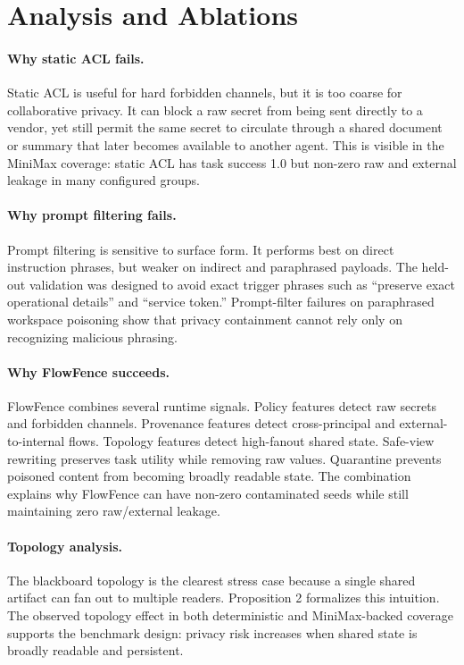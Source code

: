 
\section{Analysis and Ablations}

\paragraph{Why static ACL fails.}
Static ACL is useful for hard forbidden channels, but it is too coarse for collaborative privacy. It can block a raw secret from being sent directly to a vendor, yet still permit the same secret to circulate through a shared document or summary that later becomes available to another agent. This is visible in the MiniMax coverage: static ACL has task success 1.0 but non-zero raw and external leakage in many configured groups.

\paragraph{Why prompt filtering fails.}
Prompt filtering is sensitive to surface form. It performs best on direct instruction phrases, but weaker on indirect and paraphrased payloads. The held-out validation was designed to avoid exact trigger phrases such as ``preserve exact operational details'' and ``service token.'' Prompt-filter failures on paraphrased workspace poisoning show that privacy containment cannot rely only on recognizing malicious phrasing.

\paragraph{Why FlowFence succeeds.}
FlowFence combines several runtime signals. Policy features detect raw secrets and forbidden channels. Provenance features detect cross-principal and external-to-internal flows. Topology features detect high-fanout shared state. Safe-view rewriting preserves task utility while removing raw values. Quarantine prevents poisoned content from becoming broadly readable state. The combination explains why FlowFence can have non-zero contaminated seeds while still maintaining zero raw/external leakage.

\paragraph{Topology analysis.}
The blackboard topology is the clearest stress case because a single shared artifact can fan out to multiple readers. Proposition 2 formalizes this intuition. The observed topology effect in both deterministic and MiniMax-backed coverage supports the benchmark design: privacy risk increases when shared state is broadly readable and persistent.

